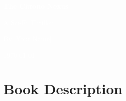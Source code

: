 \documentclass[12pt]{book}
\begin{document}
\frontmatter


\begin{titlepage}
    \centering
    \vspace*{5cm} %
    {\Huge\bfseries\textcolor{white}{The Chrono Nexus}\par}
    \vspace{1cm}
    {\Large\textcolor{white}{A Sci-Fi Thriller}\par}
    \vfill
    {\large\textcolor{white}{By [Your Name]}\par}
    \vspace{2cm}
    {\large\textcolor{white}{\today}\par}
\end{titlepage}

\restoregeometry

\chapter*{Book Description}
\end{document}
